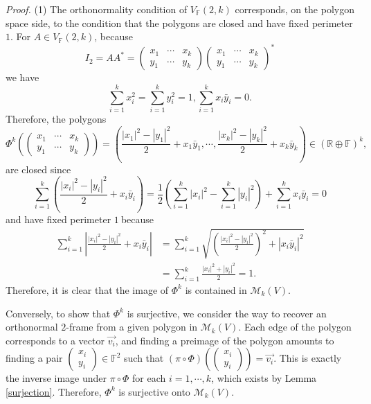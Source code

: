 \documentclass[a4paper]{article}%
\newenvironment{proof}[1][Proof]{\noindent\textit{#1.} }{}
\begin{document}
\begin{proof}
(1) The orthonormality condition of $V_{\mathbb{F}}(2,k)$ corresponds, on the
polygon space side, to the condition that the polygons are closed and have
fixed perimeter $1$. For $A\in V_{\mathbb{F}}(2,k)$, because
\[
I_{2}=AA^{\ast}=%
\begin{pmatrix}
x_{1} & \cdots & x_{k}\\
y_{1} & \cdots & y_{k}%
\end{pmatrix}%
\begin{pmatrix}
x_{1} & \cdots & x_{k}\\
y_{1} & \cdots & y_{k}%
\end{pmatrix}
^{\ast}%
\]
we have
\[
\sum_{i=1}^{k}x_{i}^{2}=\sum_{i=1}^{k}y_{i}^{2}=1,\sum_{i=1}^{k}x_{i}\bar
{y}_{i}=0\text{.}%
\]
Therefore, the polygons%
\[
\Phi^{k}\left(
\begin{pmatrix}
x_{1} & \cdots & x_{k}\\
y_{1} & \cdots & y_{k}%
\end{pmatrix}
\right)  =\left(  \frac{\left\vert x_{1}\right\vert ^{2}-\left\vert
y_{1}\right\vert ^{2}}{2}+x_{1}\bar{y}_{1},\cdots,\frac{\left\vert
x_{k}\right\vert ^{2}-\left\vert y_{k}\right\vert ^{2}}{2}+x_{k}\bar{y}%
_{k}\right)  \in\left(  \mathbb{R}\oplus\mathbb{F}\right)  ^{k}\text{,}%
\]
are closed since
\[
\sum_{i=1}^{k}\left(  \frac{\left\vert x_{i}\right\vert ^{2}-\left\vert
y_{i}\right\vert ^{2}}{2}+x_{i}\bar{y}_{i}\right)  =\frac{1}{2}\left(
\sum_{i=1}^{k}\left\vert x_{i}\right\vert ^{2}-\sum_{i=1}^{k}\left\vert
y_{i}\right\vert ^{2}\right)  +\sum_{i=1}^{k}x_{i}\bar{y}_{i}=0
\]
and have fixed perimeter $1\ $because%
\begin{align*}
\sum_{i=1}^{k}\left\vert \frac{\left\vert x_{i}\right\vert ^{2}-\left\vert
y_{i}\right\vert ^{2}}{2}+x_{i}\bar{y}_{i}\right\vert  &  =\sum_{i=1}^{k}%
\sqrt{\left(  \frac{\left\vert x_{i}\right\vert ^{2}-\left\vert y_{i}%
\right\vert ^{2}}{2}\right)  ^{2}+\left\vert x_{i}\bar{y}_{i}\right\vert ^{2}%
}\\
&  =\sum_{i=1}^{k}\frac{\left\vert x_{i}\right\vert ^{2}+\left\vert
y_{i}\right\vert ^{2}}{2}=1\text{.}%
\end{align*}
Therefore, it is clear that the image of $\Phi^{k}$ is contained in
$\mathcal{M}_{k}(V)$.

Conversely, to show that $\Phi^{k}$ is surjective, we consider the way to
recover an orthonormal $2$-frame from a given polygon in $\mathcal{M}_{k}(V)$.
Each edge of the polygon corresponds to a vector $\vec{v_{i}}$, and finding a
preimage of the polygon amounts to finding a pair $%
\begin{pmatrix}
x_{i}\\
y_{i}%
\end{pmatrix}
\in\mathbb{F}^{2}$ such that $(\pi\circ\Phi)\left(
\begin{pmatrix}
x_{i}\\
y_{i}%
\end{pmatrix}
\right)  =\vec{v_{i}}$. This is exactly the inverse image under $\pi\circ\Phi$
for each $i=1,\cdots,k$, which exists by Lemma \ref{surjection}. Therefore,
$\Phi^{k}$ is surjective onto $\mathcal{M}_{k}(V)$.


\end{proof}
\end{document}
